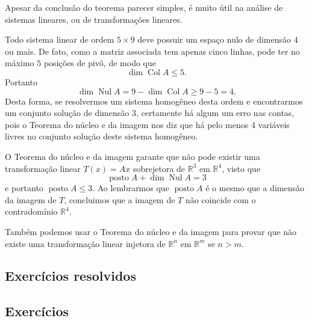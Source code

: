 Apesar da conclusão do teorema parecer simples, é muito útil na análise de sistemas lineares, ou de transformações lineares.

\begin{ex}
	Todo sistema linear de ordem $5 \times 9$ deve possuir um espaço nulo de dimensão $4$ ou mais. De fato, como a matriz associada tem apenas cinco linhas, pode ter no máximo $5$ posições de pivô, de modo que
	\begin{equation}
	\operatorname{dim} \operatorname{Col} A \le 5.
	\end{equation} Portanto
	\begin{equation}
	\operatorname{dim} \operatorname{Nul} A = 9 - \operatorname{dim} \operatorname{Col} A \ge 9 - 5 = 4.
	\end{equation} Desta forma, se resolvermos um sistema homogêneo desta ordem e encontrarmos um conjunto solução de dimensão 3, certamente  há algum um erro nas contas, pois o Teorema do núcleo e da imagem nos diz que há pelo menos 4 variáveis livres no conjunto solução deste sistema homogêneo. 
\end{ex}

\begin{ex}
 O Teorema do núcleo e da imagem garante que não pode existir uma transformação linear $T(x)=Ax$ sobrejetora de $ \mathbb{R}^3$ em  $ \mathbb{R}^4$, visto que 
 \begin{equation}
 \operatorname{posto} A + \operatorname{dim} \operatorname{Nul} A = 3
 \end{equation}
 e portanto $\operatorname{posto} A  \leq 3$. Ao lembrarmos que  $\operatorname{posto} A$ é o mesmo que a dimensão da imagem de $T$, concluimos que a imagem de $T$ não coincide com o contradomínio $ \mathbb{R}^4 $.
\end{ex}
 Também podemos usar o Teorema do núcleo e da imagem para provar que não existe uma transformação linear injetora de 
 $ \mathbb{R}^n$ em $ \mathbb{R}^m$ se $n>m$.













\subsection*{Exercícios resolvidos}

\construirExeresol

\subsection*{Exercícios}

